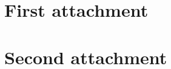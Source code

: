 \cleardoublepage
\appendix

\chapter{First attachment}
\renewcommand{\thepage}{\thechapter-\arabic{page}}

\chapter{Second attachment}
\renewcommand{\thepage}{\thechapter-\arabic{page}}
